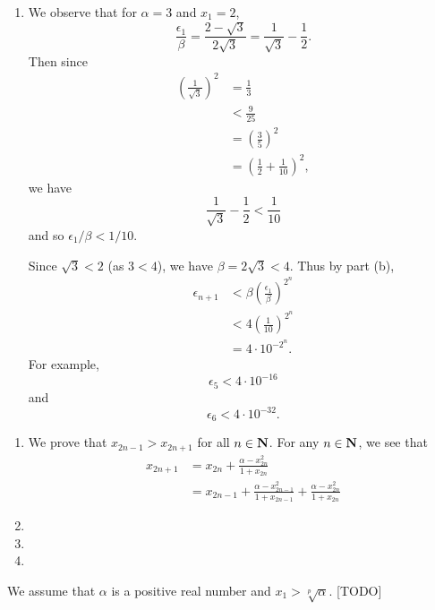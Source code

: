 \begin{ex}
\begin{enumerate}
\item We observe that for $\alpha = 3$ and $x_1 = 2$, \[\frac{\epsilon_1}{\beta} = \frac{2 - \sqrt{3}}{2\sqrt{3}} = \frac{1}{\sqrt{3}} - \frac{1}{2}.\] Then since
\begin{align*}
\left(\frac{1}{\sqrt{3}}\right)^2 & = \frac{1}{3}\\
& < \frac{9}{25}\\
& = \left(\frac{3}{5}\right)^2\\
& = \left(\frac{1}{2} + \frac{1}{10}\right)^2,
\end{align*}
we have \[\frac{1}{\sqrt{3}} - \frac{1}{2} < \frac{1}{10}\] and so $\epsilon_1/\beta < 1/10$.

Since $\sqrt{3} < 2$ (as $3 < 4$), we have $\beta = 2\sqrt{3} < 4$. Thus by part (b),
\begin{align*}
\epsilon_{n+1} & < \beta\left(\frac{\epsilon_1}{\beta}\right)^{2^n}\\
& < 4\left(\frac{1}{10}\right)^{2^n}\\
& = 4\cdot 10^{-2^n}.
\end{align*}
For example, \[\epsilon_5 < 4\cdot 10^{-16}\] and \[\epsilon_6 < 4\cdot 10^{-32}.\]
\end{enumerate}
\end{ex}

\begin{ex}
\begin{enumerate}
\item We prove that $x_{2n-1} > x_{2n+1}$ for all $n \in \mathbf{N}$. For any $n \in \mathbf{N}$, we see that
\begin{align*}
x_{2n+1} & = x_{2n} + \frac{\alpha - x_{2n}^2}{1 + x_{2n}}\\
& = x_{2n-1} + \frac{\alpha - x_{2n-1}^2}{1 + x_{2n-1}} + \frac{\alpha - x_{2n}^2}{1 + x_{2n}}
\end{align*}

\item 

\item 

\item 
\end{enumerate}
\end{ex}

\begin{ex}
We assume that $\alpha$ is a positive real number and $x_1 > \sqrt[p]{\alpha}$. [TODO]
\end{ex}

\begin{ex}

\end{ex}


